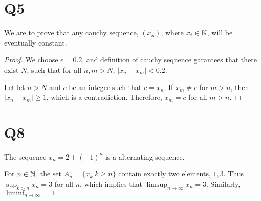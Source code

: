 \documentclass[12pt]{article}
\begin{document}
\section{Q5}

We are to prove that any cauchy sequence, $(x_n)$, where $x_i \in \mathbb{N}$, will be eventually constant.

\begin{proof}
We choose $\epsilon = 0.2$, and definition of cauchy sequence garantees that there exist $N$, such that for all $n,m>N$, $|x_n-x_m|<0.2$.

Let let $n>N$ and $c$ be an integer such that $c=x_n$. If $x_m \neq c$ for $m>n$, then $|x_n-x_m| \geq 1$, which is a contradiction. Therefore, $x_m=c$ for all $m>n$. 
\end{proof}

\section{Q8}

The sequence $x_n = 2+(-1)^n$ is a alternating sequence.

For $n \in \mathbb{N}$, the set $A_n = \{x_k | k \geq n\}$ contain exactly two elements, $1, 3$. Thus $\sup_{k>n}x_n = 3$ for all $n$, which implies that $\limsup_{n \to \infty} x_n = 3$. Similarly, $\liminf_{n \to \infty} = 1$
\end{document}
